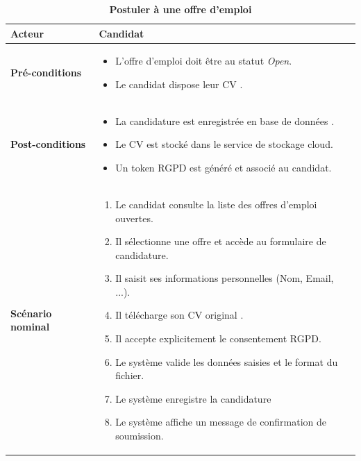 \documentclass[12pt,a4paper,oneside]{report}
\begin{document}
\begin{itemize}
\renewcommand{\arraystretch}{1}

\begin{xltabular}{\textwidth}{|l|X|}
    \caption{\textbf{Postuler à une offre d'emploi}}
    \hline
    \textbf{Acteur } & Candidat \\ \hline
   
  


    \textbf{Pré-conditions} & 
    \begin{itemize}[leftmargin=*, nosep]
        \item L'offre d'emploi doit être au statut \textit{Open}.
        \item Le candidat dispose leur CV .
    \end{itemize} \\ \hline
    
    \textbf{Post-conditions} & 
    \begin{itemize}[leftmargin=*, nosep]
        \item La candidature est enregistrée en base de données .
        \item Le CV est stocké dans le service de stockage cloud.
        \item Un token RGPD est généré et associé au candidat.
    \end{itemize} \\ \hline
    
    \textbf{Scénario nominal} & 
    \begin{enumerate}[leftmargin=*, nosep]
        \item Le candidat consulte la liste des offres d'emploi ouvertes.
        \item Il sélectionne une offre et accède au formulaire de candidature.
        \item Il saisit ses informations personnelles (Nom, Email, ...).
        \item Il télécharge son CV original .
        \item Il accepte explicitement le consentement RGPD.
        \item Le système valide les données saisies et le format du fichier.
        \item Le système enregistre la candidature 
        \item Le système affiche un message de confirmation de soumission.
    \end{enumerate} \\ \hline
    

\end{xltabular}
\end{itemize}
\end{document}
